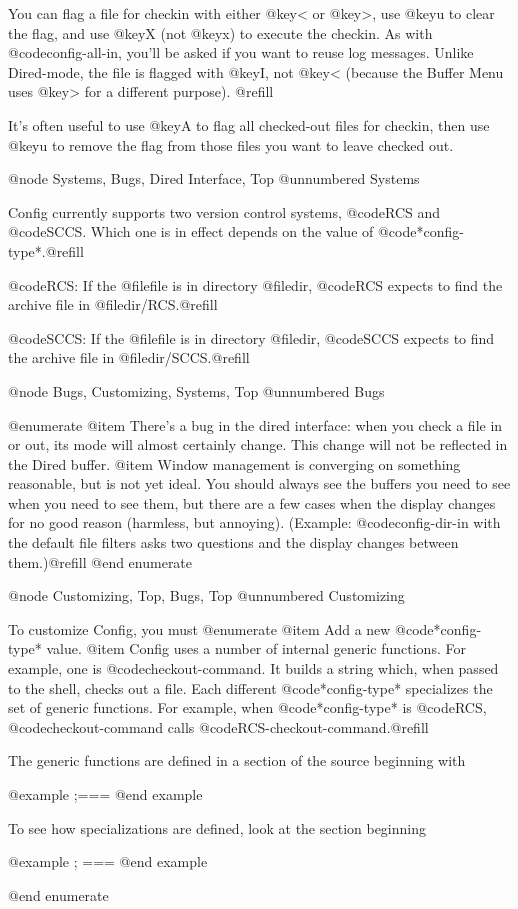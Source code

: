 You can flag a file for checkin with either @key{<} or @key{>}, use
@key{u} to clear the flag, and use @key{X} (not @key{x}) to execute
the checkin.  As with @code{config-all-in}, you'll be asked if you
want to reuse log messages.  Unlike Dired-mode, the file is flagged
with @key{I}, not @key{<} (because the Buffer Menu uses @key{>} for a
different purpose). @refill

It's often useful to use @key{A} to flag all checked-out files for
checkin, then use @key{u} to remove the flag from those files you want
to leave checked out.

@node Systems, Bugs, Dired Interface, Top
@unnumbered Systems

Config currently supports two version control systems, @code{RCS} and
@code{SCCS}.  Which one is in effect depends on the value of
@code{*config-type*}.@refill

@code{RCS}:  If the @file{file} is in directory @file{dir}, @code{RCS}
expects to find the archive file in @file{dir/RCS}.@refill

@code{SCCS}:  If the @file{file} is in directory @file{dir}, @code{SCCS}
expects to find the archive file in @file{dir/SCCS}.@refill

@node Bugs, Customizing, Systems, Top
@unnumbered Bugs

@enumerate
@item
There's a bug in the dired interface:  when you check a file in or
out, its mode will almost certainly change.  This change will not be
reflected in the Dired buffer.
@item
Window management is converging on something reasonable, but is not
yet ideal.  You should always see the buffers you need to see when you
need to see them, but there are a few cases when the display changes
for no good reason (harmless, but annoying).  (Example:
@code{config-dir-in} with the default file filters asks two questions
and the display changes between them.)@refill
@end enumerate

@node Customizing, Top, Bugs, Top
@unnumbered Customizing

To customize Config, you must
@enumerate
@item
Add a new @code{*config-type*} value.
@item 
Config uses a number of internal generic functions.  For example, one
is @code{checkout-command}.  It builds a string which, when passed to
the shell, checks out a file.  Each different @code{*config-type*}
specializes the set of generic functions.  For example, when
@code{*config-type*} is @code{RCS}, @code{checkout-command} calls
@code{RCS-checkout-command}.@refill

The generic functions are defined in a section of the source beginning
with 

@example
;===%
@end example

To see how specializations are defined, look at the section beginning

@example
;   ===%
@end example

@end enumerate

